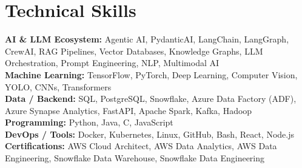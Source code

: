 \documentclass[letterpaper,11pt]{article}
\begin{document}
\section{Technical Skills}
\begin{itemize}[leftmargin=0.15in, label={}]
\small{\item{
    \textbf{AI \& LLM Ecosystem:}{
    Agentic AI, PydanticAI, LangChain, LangGraph, CrewAI, RAG Pipelines, Vector Databases, Knowledge Graphs, 
    LLM Orchestration, Prompt Engineering, NLP, Multimodal AI} \\[3pt]
    \textbf{Machine Learning:}{
    TensorFlow, PyTorch, Deep Learning, Computer Vision, YOLO, CNNs, Transformers} \\[3pt]
    \textbf{Data / Backend:}{
    SQL, PostgreSQL, Snowflake, Azure Data Factory (ADF), Azure Synapse Analytics, FastAPI, Apache Spark, Kafka, Hadoop} \\[3pt]
    \textbf{Programming:}{
    Python, Java, C, JavaScript} \\[3pt]
    \textbf{DevOps / Tools:}{
    Docker, Kubernetes, Linux, GitHub, Bash, React, Node.js} \\[3pt]
    \textbf{Certifications:}{
    AWS Cloud Architect, AWS Data Analytics, AWS Data Engineering, Snowflake Data Warehouse, Snowflake Data Engineering} \\
}}
\end{itemize}
\end{document}
